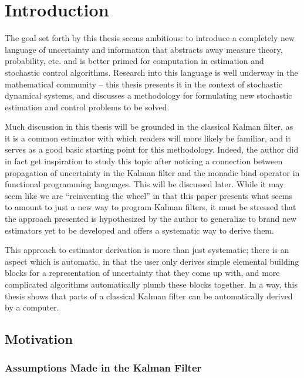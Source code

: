 \chapter{Introduction}

The goal set forth by this thesis seems ambitious: to introduce a completely new language of uncertainty and information that abstracts away measure theory, probability, etc. and is better primed for computation in estimation and stochastic control algorithms.
Research into this language is well underway in the mathematical community -- this thesis presents it in the context of stochastic dynamical systems, and discusses a methodology for formulating new stochastic estimation and control problems to be solved.

Much discussion in this thesis will be grounded in the classical Kalman filter, as it is a common estimator with which readers will more likely be familiar, and it serves as a good basic starting point for this methodology.
Indeed, the author did in fact get inspiration to study this topic after noticing a connection between propagation of uncertainty in the Kalman filter and the monadic bind operator in functional programming languages. This will be discussed later. While it may seem like we are ``reinventing the wheel'' in that this paper presents what seems to amount to just a new way to program Kalman filters, it must be stressed that the approach presented is hypothesized by the author to generalize to brand new estimators yet to be developed and offers a systematic way to derive them.

This approach to estimator derivation is more than just systematic; there is an aspect which is automatic, in that the user only derives simple elemental building blocks for a representation of uncertainty that they come up with, and more complicated algorithms automatically plumb these blocks together. In a way, this thesis shows that parts of a classical Kalman filter can be automatically derived by a computer.


\section{Motivation}


\subsection{Assumptions Made in the Kalman Filter}


